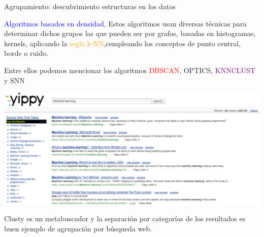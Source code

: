 \documentclass[11pt]{beamer}
\begin{document}
\begin{frame}{Agrupamiento: descubrimiento estructuras en los datos}
\begin{itemize}
\scriptsize{\item \textcolor{blue}{Algoritmos basados en densidad}, Estos algoritmos usan diversas t\'ecnicas para determinar dichos grupos las que pueden ser por grafos, basadas en histogramas, kernels, aplicando la \textcolor{orange}{regla k-NN},cempleando los conceptos de punto central, borde o ruido. 
	
Entre ellos podemos mencionar los algoritmos \textcolor{red}{DBSCAN}, \textcolor{green!55!purple}{OPTICS}, \textcolor{purple}{KNNCLUST} y \textcolor{yellow!75!blue}{SNN}
}
\end{itemize}

\vspace{0.3cm}

\begin{center}
	\includegraphics[width=0.7 \textwidth]{ML15.png}	
\end{center}

\vspace{0.3cm}


\tiny{\qquad Clusty es un  metabuscador y  la separaci\'on por categor\'ias de los resultados es buen ejemplo de agrupaci\'on por b\'usqueda web.}

\end{frame}
\end{document}
